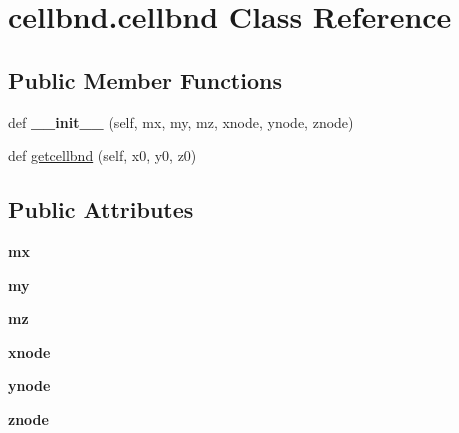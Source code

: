 \hypertarget{classcellbnd_1_1cellbnd}{}\section{cellbnd.\+cellbnd Class Reference}
\label{classcellbnd_1_1cellbnd}
\subsection*{Public Member Functions}
\begin{DoxyCompactItemize}
\item 
\mbox{\label{classcellbnd_1_1cellbnd_ac6d8ec2c7cc0d2aa3a855438c54b1b12}} 
def {\bfseries \+\_\+\+\_\+init\+\_\+\+\_\+} (self, mx, my, mz, xnode, ynode, znode)
\item 
def \hyperlink{classcellbnd_1_1cellbnd_a0954f88f9f231b47290dd86cc38b878a}{getcellbnd} (self, x0, y0, z0)
\end{DoxyCompactItemize}
\subsection*{Public Attributes}
\begin{DoxyCompactItemize}
\item 
\mbox{\label{classcellbnd_1_1cellbnd_a88072468e83a49c31a9e5bfb80ce6001}} 
{\bfseries mx}
\item 
\mbox{\label{classcellbnd_1_1cellbnd_aa221a63ea1eb591ab89a810d1ec0a898}} 
{\bfseries my}
\item 
\mbox{\label{classcellbnd_1_1cellbnd_a98ac6d62d3a1958033352e269ae644b3}} 
{\bfseries mz}
\item 
\mbox{\label{classcellbnd_1_1cellbnd_abfd600cc1fa4ed1d62750c3f4c2d5955}} 
{\bfseries xnode}
\item 
\mbox{\label{classcellbnd_1_1cellbnd_a6e7f55fd07dae99297dea19697476578}} 
{\bfseries ynode}
\item 
\mbox{\label{classcellbnd_1_1cellbnd_a37e5366d4ff1fd6668bbccb36a235377}} 
{\bfseries znode}
\end{DoxyCompactItemize}


